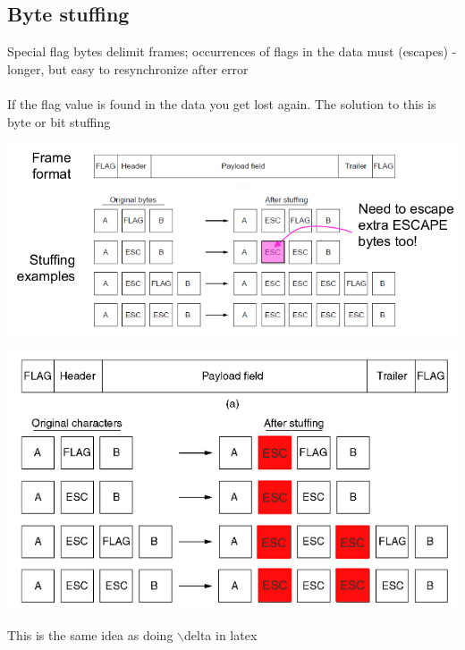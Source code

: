 \documentclass{article}[18pt]
\begin{document}
\subsection{Byte stuffing}
Special flag bytes delimit frames; occurrences of flags in the data must (escapes) - longer, but easy to resynchronize after error\\
\\
If the flag value is found in the data you get lost again. The solution to this is byte or bit stuffing
\begin{center}
	\includegraphics[scale=0.7]{"byte stuffing"}
\end{center}
\begin{center}
	\includegraphics[scale=0.7]{"byte stuffing1"}
\end{center}
This is the same idea as doing $\backslash$delta in latex
\end{document}
